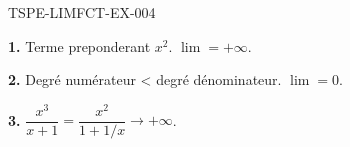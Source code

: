\begin{corrige}{TSPE-LIMFCT-EX-004}

\textbf{1.} Terme preponderant $x^2$. $\boxed{\lim = +\infty}$.

\textbf{2.} Degré numérateur < degré dénominateur. $\boxed{\lim = 0}$.

\textbf{3.} $\dfrac{x^3}{x+1} = \dfrac{x^2}{1+1/x} \to \boxed{+\infty}$.

\end{corrige}
